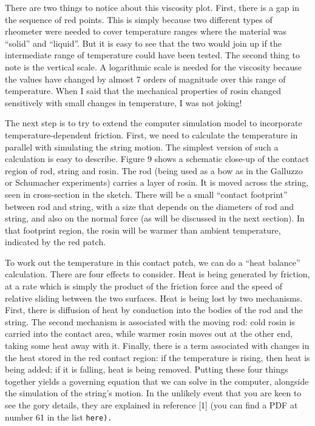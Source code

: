   There are two things to notice about this viscosity plot. First, there is a 
  gap in the sequence of red points. This is simply because two different types 
  of rheometer were needed to cover temperature ranges where the material was 
  “solid” and “liquid”. But it is easy to see that the two would join up if the 
  intermediate range of temperature could have been tested. The second thing to 
  note is the vertical scale. A logarithmic scale is needed for the viscosity 
  because the values have changed by almost 7 orders of magnitude over this 
  range of temperature. When I said that the mechanical properties of rosin 
  changed sensitively with small changes in temperature, I was not joking! 

  The next step is to try to extend the computer simulation model to 
  incorporate temperature-dependent friction. First, we need to calculate the 
  temperature in parallel with simulating the string motion. The simplest 
  version of such a calculation is easy to describe. Figure 9 shows a schematic 
  close-up of the contact region of rod, string and rosin. The rod (being used 
  as a bow as in the Galluzzo or Schumacher experiments) carries a layer of 
  rosin. It is moved across the string, seen in cross-section in the sketch. 
  There will be a small “contact footprint” between rod and string, with a size 
  that depends on the diameters of rod and string, and also on the normal force 
  (as will be discussed in the next section). In that footprint region, the 
  rosin will be warmer than ambient temperature, indicated by the red patch. 


  To work out the temperature in this contact patch, we can do a “heat balance” 
  calculation. There are four effects to consider. Heat is being generated by 
  friction, at a rate which is simply the product of the friction force and the 
  speed of relative sliding between the two surfaces. Heat is being lost by two 
  mechanisms. First, there is diffusion of heat by conduction into the bodies 
  of the rod and the string. The second mechanism is associated with the moving 
  rod: cold rosin is carried into the contact area, while warmer rosin moves 
  out at the other end, taking some heat away with it. Finally, there is a term 
  associated with changes in the heat stored in the red contact region: if the 
  temperature is rising, then heat is being added; if it is falling, heat is 
  being removed. Putting these four things together yields a governing equation 
  that we can solve in the computer, alongside the simulation of the string's 
  motion. In the unlikely event that you are keen to see the gory details, they 
  are explained in reference [1] (you can find a PDF at number 61 in the list 
  \tt{}here\rm{}). 


